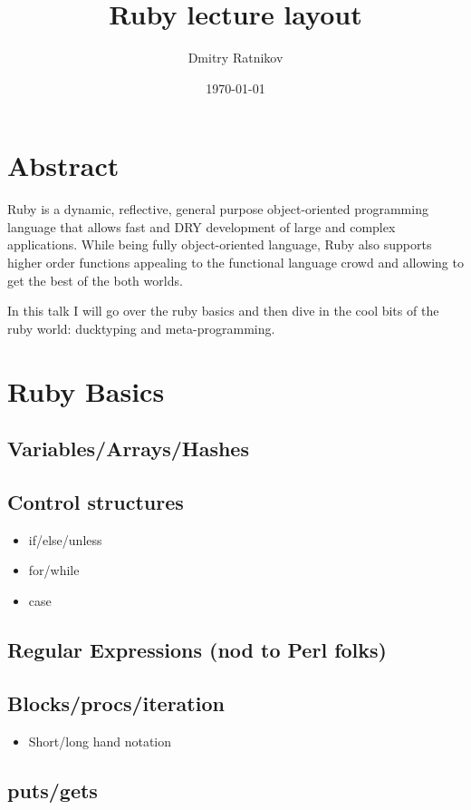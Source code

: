 \documentclass{article}
\title{Ruby lecture layout}
\author{Dmitry Ratnikov}
\date{\today}
\begin{document}
\maketitle

\section{Abstract}

Ruby is a dynamic, reflective, general purpose object-oriented programming language that allows fast and DRY development of large and complex applications. While being
fully object-oriented language, Ruby also supports higher order functions appealing to the functional language crowd and allowing to get the best of the both worlds.

In this talk I will go over the ruby basics and then dive in the cool bits of the ruby world: ducktyping and meta-programming.
\section{Ruby Basics}

\subsection{Variables/Arrays/Hashes}
\subsection{Control structures}
\begin{itemize}
  \item if/else/unless
  \item for/while
  \item case
\end{itemize}

\subsection{Regular Expressions (nod to Perl folks)}

\subsection{Blocks/procs/iteration}

\begin{itemize}
  \item Short/long hand notation
\end{itemize}

\subsection{puts/gets}
\end{document}
